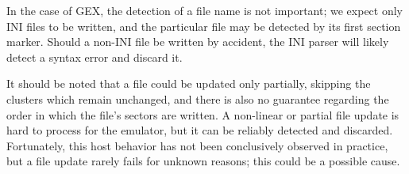 In the case of GEX, the detection of a file name is not important; we expect only INI files to be written, and the particular file may be detected by its first section marker. Should a non-INI file be written by accident, the INI parser will likely detect a syntax error and discard it.

It should be noted that a file could be updated only partially, skipping the clusters which remain unchanged, and there is also no guarantee regarding the order in which the file's sectors are written. A non-linear or partial file update is hard to process for the emulator, but it can be reliably detected and discarded. Fortunately, this host behavior has not been conclusively observed in practice, but a file update rarely fails for unknown reasons; this could be a possible cause.












